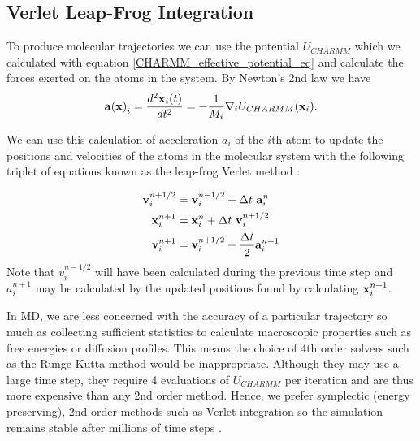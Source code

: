 \subsection{ Verlet Leap-Frog Integration}
To produce molecular trajectories we can use the potential $U_{CHARMM}$ which we calculated with equation \ref{CHARMM_effective_potential_eq} and calculate the forces exerted on the atoms in the system.  By Newton's 2nd law we have 
\begin{equation}
	\bold{a(\bold{x})}_i = \frac{d^2 \bold{x}_i(t)}{dt^2} = - \frac{1}{M_i} \nabla_i U_{CHARMM}(\bold{x}_i).
\end{equation}
 
We can use this calculation of acceleration $a_i$ of the $i$th atom to update the positions and velocities of the atoms in the molecular system with the following triplet of equations known as the leap-frog Verlet method \cite{schlick2010}:

\begin{equation} \label {leap-frog_equation}
	\begin{aligned}
		\bold{v}_i^{n+1/2} &= \bold{v}_i^{n-1/2} + \Delta t\  \bold{a}_i^n \\
		\bold{x}^{n+1}_i &= \bold{x}_i^{n} + \Delta t\  \bold{v}_i^{n+1/2}  \\
		\bold{v}^{n+1}_i &= \bold{v}_i^{n+1/2} + \frac{\Delta t} {2} \bold{a}_i^{n+1} \\
	\end{aligned}
 \end{equation}
 Note that $v_i^{n-1/2}$ will have  been calculated during the previous time step and $a_i^{n+1}$ may be  calculated by the updated positions found by calculating  $\bold{x}^{n+1}_i$.

 In MD, we are less concerned with the accuracy of a particular trajectory so much as collecting sufficient statistics to calculate macroscopic properties such as free energies or diffusion profiles. This means the choice of 4th order solvers such as the Runge-Kutta method would be inappropriate. Although they may use a large time step, they require 4 evaluations of $U_{CHARMM}$ per iteration and are thus more expensive than any 2nd order method. Hence, we prefer symplectic (energy preserving), 2nd order methods such as Verlet integration so the simulation remains stable after millions of time steps \cite{streett1978}. 

